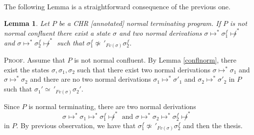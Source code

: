 \documentclass[final]{acmtrans2e}
\newtheorem{lemma}[theorem]{Lemma}
\begin{document}
\noindent{$\Box$}

The following Lemma is a straightforward consequence of the previous one.

\begin{lemma}\label{conflnormterm}
Let $P$ be a CHR [annotated] normal terminating program. If $P$ is not normal confluent there exist a state
$\sigma$ and two normal derivations $\sigma\mapsto^{*} \sigma_1^f\not \mapsto^{*} $ and $\sigma\mapsto^{*} \sigma_2^f\not\mapsto^{*} $ such that
$\sigma_1^f \not \simeq\,'_{Fv(\sigma)}\sigma_2^f$.
\end{lemma}
\textsc{Proof.}
Assume that $P$ is not normal confluent. By Lemma \ref{conflnorm},
there exist the states
$\sigma, \sigma_1, \sigma_2$ such that
there exist two normal derivations $\sigma\mapsto^{*} \sigma_1$ and $\sigma\mapsto^{*} \sigma_2$ and there are no two normal derivations $\sigma_1 \mapsto^{*}\sigma'_1$ and $\sigma_2\mapsto^{*}\sigma'_2$ in $P$ such that $\sigma_1'\simeq\,'_{Fv(\sigma)}\sigma_2'$.


Since $P$ is normal terminating, there are two normal derivations
\[\sigma \mapsto^{*}\sigma_1 \mapsto^{*}\sigma_1^f \not \mapsto^{*} \mbox{ and } \sigma\mapsto^{*}\sigma_2\mapsto^{*}\sigma_2^f\not\mapsto^{*}
\]
in $P$. By previous observation, we have that $\sigma_1^f \not \simeq\,'_{Fv(\sigma)} \sigma_2^f$ and then the thesis.

\noindent{$\Box$}
\end{document}
